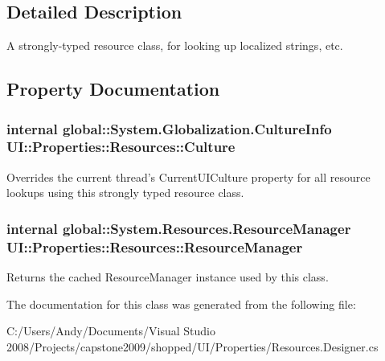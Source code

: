 \subsection{Detailed Description}
A strongly-\/typed resource class, for looking up localized strings, etc. 

\subsection{Property Documentation}
\hypertarget{class_u_i_1_1_properties_1_1_resources_a46a0e9bbbbdb0717d4a25428483b2728}{
\subsubsection[{Culture}]{\setlength{\rightskip}{0pt plus 5cm}internal global::System.Globalization.CultureInfo UI::Properties::Resources::Culture}}
\label{class_u_i_1_1_properties_1_1_resources_a46a0e9bbbbdb0717d4a25428483b2728}


Overrides the current thread's CurrentUICulture property for all resource lookups using this strongly typed resource class. \hypertarget{class_u_i_1_1_properties_1_1_resources_a8766fbe41ebf10ebf9984cbe9e4ad7f9}{
\subsubsection[{ResourceManager}]{\setlength{\rightskip}{0pt plus 5cm}internal global::System.Resources.ResourceManager UI::Properties::Resources::ResourceManager}}
\label{class_u_i_1_1_properties_1_1_resources_a8766fbe41ebf10ebf9984cbe9e4ad7f9}


Returns the cached ResourceManager instance used by this class. 

The documentation for this class was generated from the following file:\begin{DoxyCompactItemize}
\item 
C:/Users/Andy/Documents/Visual Studio 2008/Projects/capstone2009/shopped/UI/Properties/Resources.Designer.cs\end{DoxyCompactItemize}
